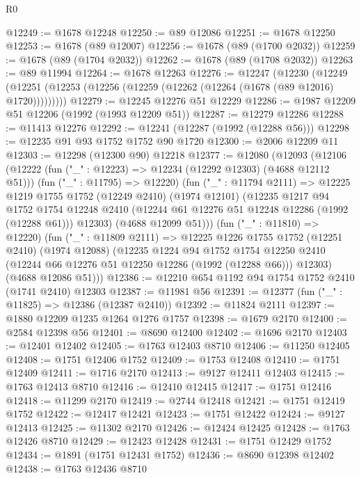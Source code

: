 \begin{lexlean}{R0}
\begin{coremodule}
@12249 := @1678 @12248
@12250 := @89 @12086
@12251 := @1678 @12250
@12253 := @1678 (@89 @12007)
@12256 := @1678 (@89 (@1700 @2032))
@12259 := @1678 (@89 (@1704 @2032))
@12262 := @1678 (@89 (@1708 @2032))
@12263 := @89 @11994
@12264 := @1678 @12263
@12276 := @12247
    (@12230
      (@12249 (@12251 (@12253 (@12256 (@12259 (@12262 (@12264 (@1678 (@89 @12016) @1720)))))))))
@12279 := @12245 @12276 @51 @12229
@12286 := @1987 @12209 @51 @12206 (@1992 (@1993 @12209 @51))
@12287 := @12279 @12286
@12288 := @11413 @12276
@12292 := @12241 (@12287 (@1992 (@12288 @56)))
@12298 := @12235 @91 @93 @1752 @1752 @90 @1720
@12300 := @2006 @12209 @11
@12303 := @12298 (@12300 @90) @12218
@12377 := @12080
    (@12093
      (@12106
        (@12222 (fun ("_" : @12223) => @12234 (@12292 @12303) (@4688 @12112 @51)))
        (fun ("_" : @11795) => @12220)
        (fun ("_" : @11794 @2111) =>
        @12225
          @1219
          @1755
          @1752
          (@12249 @2410)
          (@1974 @12101)
          (@12235
            @1217
            @94
            @1752
            @1754
            @12248
            @2410
            (@12244 @61 @12276 @51 @12248 @12286 (@1992 (@12288 @61)))
            @12303)
          (@4688 @12099 @51)))
      (fun ("_" : @11810) => @12220)
      (fun ("_" : @11809 @2111) =>
      @12225
        @1226
        @1755
        @1752
        (@12251 @2410)
        (@1974 @12088)
        (@12235
          @1224
          @94
          @1752
          @1754
          @12250
          @2410
          (@12244 @66 @12276 @51 @12250 @12286 (@1992 (@12288 @66)))
          @12303)
        (@4688 @12086 @51)))
@12386 := @12210 @654 @1192 @94 @1754 @1752 @2410 (@1741 @2410) @12303
@12387 := @11981 @56
@12391 := @12377 (fun ("_" : @11825) => @12386 (@12387 @2410))
@12392 := @11824 @2111
@12397 := @1880 @12209 @1235 @1264 @1276 @1757
@12398 := @1679 @2170
@12400 := @2584 @12398 @56
@12401 := @8690 @12400
@12402 := @1696 @2170
@12403 := @12401 @12402
@12405 := @1763 @12403 @8710
@12406 := @11250 @12405
@12408 := @1751 @12406 @1752
@12409 := @1753 @12408
@12410 := @1751 @12409
@12411 := @1716 @2170
@12413 := @9127 @12411 @12403
@12415 := @1763 @12413 @8710
@12416 := @12410 @12415
@12417 := @1751 @12416
@12418 := @11299 @2170
@12419 := @2744 @12418
@12421 := @1751 @12419 @1752
@12422 := @12417 @12421
@12423 := @1751 @12422
@12424 := @9127 @12413
@12425 := @11302 @2170
@12426 := @12424 @12425
@12428 := @1763 @12426 @8710
@12429 := @12423 @12428
@12431 := @1751 @12429 @1752
@12434 := @1891 (@1751 @12431 @1752)
@12436 := @8690 @12398 @12402
@12438 := @1763 @12436 @8710

\end{coremodule}
\end{lexlean}
